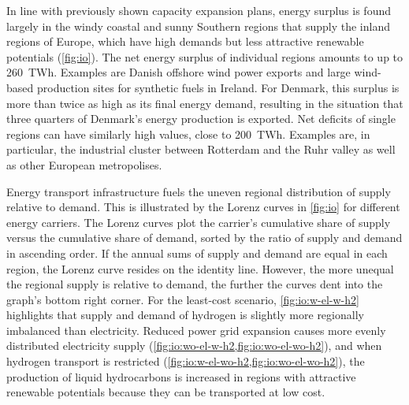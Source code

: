 In line with previously shown capacity expansion plans, energy surplus is found
largely in the windy coastal and sunny Southern regions that supply the inland
regions of Europe, which have high demands but less attractive renewable
potentials (\cref{fig:io}). The net energy surplus of individual regions amounts
to up to 260~TWh. Examples are Danish offshore wind power exports and large
wind-based production sites for synthetic fuels in Ireland. For Denmark, this
surplus is more than twice as high as its final energy demand, resulting in the
situation that three quarters of Denmark's energy production is exported. Net
deficits of single regions can have similarly high values, close to 200~TWh.
Examples are, in particular, the industrial cluster between Rotterdam and the
Ruhr valley as well as other European metropolises.

Energy transport infrastructure fuels the uneven regional distribution of supply
relative to demand. This is illustrated by the Lorenz curves in \cref{fig:io}
for different energy carriers. The Lorenz curves plot the carrier's cumulative
share of supply versus the cumulative share of demand, sorted by the ratio of
supply and demand in ascending order. If the annual sums of supply and demand
are equal in each region, the Lorenz curve resides on the identity line.
However, the more unequal the regional supply is relative to demand, the further
the curves dent into the graph's bottom right corner. For the least-cost
scenario, \cref{fig:io:w-el-w-h2} highlights that supply and demand of hydrogen
is slightly more regionally imbalanced than electricity. Reduced power grid
expansion causes more evenly distributed electricity supply
(\cref{fig:io:wo-el-w-h2,fig:io:wo-el-wo-h2}), and when hydrogen transport is
restricted (\cref{fig:io:w-el-wo-h2,fig:io:wo-el-wo-h2}), the production of
liquid hydrocarbons is increased in regions with attractive renewable potentials
because they can be transported at low cost.

